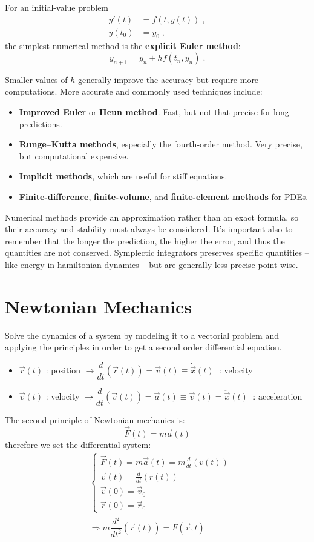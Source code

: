 \documentclass[12pt,a4paper]{article}
\begin{document}
For an initial-value problem
\begin{align*}
	y'(t) &= f(t,y(t))\;,\\
	y(t_0) &= y_0\;,
\end{align*}
the simplest numerical method is the \textbf{explicit Euler method}:
$$
y_{n+1} = y_n + h f(t_n,y_n)\;.
$$

Smaller values of $h$ generally improve the accuracy but require more computations. More accurate and commonly used techniques include:

\begin{itemize}
	\item \textbf{Improved Euler} or \textbf{Heun method}. Fast, but not that precise for long predictions.
	\item \textbf{Runge--Kutta methods}, especially the fourth-order method. Very precise, but computational expensive.
	\item \textbf{Implicit methods}, which are useful for stiff equations.
	\item \textbf{Finite-difference}, \textbf{finite-volume}, and \textbf{finite-element methods} for PDEs.
\end{itemize}

Numerical methods provide an approximation rather than an exact formula, so their accuracy and stability must always be considered. It's important also to remember that the longer the prediction, the higher the error, and thus the quantities are not conserved.
Symplectic integrators preserves specific quantities -- like energy in hamiltonian dynamics -- but are generally less precise point-wise.


\section{Newtonian Mechanics}
Solve the dynamics of a system by modeling it to a vectorial problem and
applying the principles in order to get a second order differential equation.
\begin{itemize}
	\item $\vec{r}(t)$ : position $\longrightarrow \dfrac{d}{dt} (\vec{r}(t)) = \vec{v}(t) \equiv \dot{\vec{x}}(t)\;$ : velocity
	\item $\vec{v}(t)$ : velocity $\longrightarrow \dfrac{d}{dt} (\vec{v}(t)) = \vec{a}(t) \equiv \dot{\vec{v}}(t) = \ddot{\vec{x}}(t) \;$ : acceleration
\end{itemize}
The second principle of Newtonian mechanics is:
\begin{equation}
	\vec{F}(t) = m\vec{a}(t)
\end{equation}
therefore we set the differential system:
\begin{align*}
&\begin{cases}
	\vec{F}(t) = m\vec{a}(t) = 	m \frac{d}{dt}(v(t))\\
	\vec{v}(t) = \frac{d}{dt}(r(t))\\
	\vec{v}(0) = \vec{v}_0 \\
	\vec{r}(0) = \vec{r}_0
\end{cases}\\
&\Rightarrow m\dfrac{d^2}{dt^2}(\vec{r}(t)) = F(\vec{r},t)
\end{align*}
\end{document}
